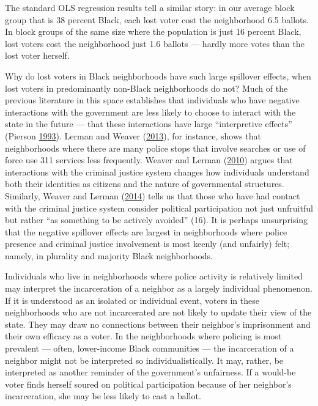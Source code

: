 \documentclass[
  12pt,
]{article}
\begin{document}
The standard OLS regression results tell a similar story: in our average block group that is 38 percent Black, each lost voter cost the neighborhood 6.5 ballots. In block groups of the same size where the population is just 16 percent Black, lost voters cost the neighborhood just 1.6 ballots --- hardly more votes than the lost voter herself.

Why do lost voters in Black neighborhoods have such large spillover effects, when lost voters in predominantly non-Black neighborhoods do not? Much of the previous literature in this space establishes that individuals who have negative interactions with the government are less likely to choose to interact with the state in the future --- that these interactions have large ``interpretive effects'' (Pierson \protect\hyperlink{ref-Pierson1993}{1993}). Lerman and Weaver (\protect\hyperlink{ref-Lerman2013}{2013}), for instance, shows that neighborhoods where there are many police stops that involve searches or use of force use 311 services less frequently. Weaver and Lerman (\protect\hyperlink{ref-Weaver2010}{2010}) argues that interactions with the criminal justice system changes how individuals understand both their identities as citizens and the nature of governmental structures. Similarly, Weaver and Lerman (\protect\hyperlink{ref-Weaver2014}{2014}) tells us that those who have had contact with the criminal justice system consider political participation not just unfruitful but rather ``as something to be actively avoided'' (16). It is perhaps unsurprising that the negative spillover effects are largest in neighborhoods where police presence and criminal justice involvement is most keenly (and unfairly) felt; namely, in plurality and majority Black neighborhoods.

Individuals who live in neighborhoods where police activity is relatively limited may interpret the incarceration of a neighbor as a largely individual phenomenon. If it is understood as an isolated or individual event, voters in these neighborhoods who are not incarcerated are not likely to update their view of the state. They may draw no connections between their neighbor's imprisonment and their own efficacy as a voter. In the neighborhoods where policing is most prevalent --- often, lower-income Black communities --- the incarceration of a neighbor might not be interpreted so individualistically. It may, rather, be interpreted as another reminder of the government's unfairness. If a would-be voter finds herself soured on political participation because of her neighbor's incarceration, she may be less likely to cast a ballot.
\end{document}
